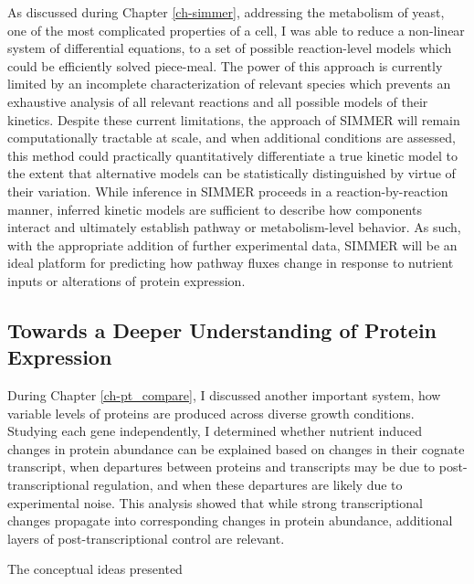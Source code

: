 As discussed during Chapter \ref{ch-simmer}, addressing the metabolism of yeast, one of the most complicated properties of a cell, I was able to reduce a non-linear system of differential equations, to a set of possible reaction-level models which could be efficiently solved piece-meal. The power of this approach is currently limited by an incomplete characterization of relevant species which prevents an exhaustive analysis of all relevant reactions and all possible models of their kinetics. Despite these current limitations, the approach of SIMMER will remain computationally tractable at scale, and when additional conditions are assessed, this method could practically quantitatively differentiate a true kinetic model to the extent that alternative models can be statistically distinguished by virtue of their variation. While inference in SIMMER proceeds in a reaction-by-reaction manner, inferred kinetic models are sufficient to describe how components interact and ultimately establish pathway or metabolism-level behavior. As such, with the appropriate addition of further experimental data, SIMMER will be an ideal platform for predicting how pathway fluxes change in response to nutrient inputs or alterations of protein expression.

\subsection{Towards a Deeper Understanding of Protein Expression}

During Chapter \ref{ch-pt_compare}, I discussed another important system, how variable levels of proteins are produced across diverse growth conditions. Studying each gene independently, I determined whether nutrient induced changes in protein abundance can be explained based on changes in their cognate transcript, when departures between proteins and transcripts may be due to post-transcriptional regulation, and when these departures are likely due to experimental noise. This analysis showed that while strong transcriptional changes propagate into corresponding changes in protein abundance, additional layers of post-transcriptional control are relevant.

The conceptual ideas presented 